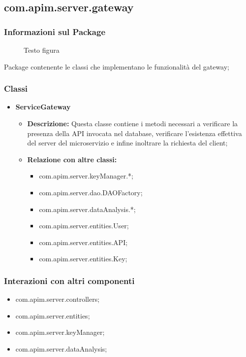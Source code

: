 {{  \subsection{com.apim.server.gateway}{
    \subsubsection{Informazioni sul Package}
      \begin{figure}[ht]
        \centering
        \caption{Testo figura}
        \label{Testo figura}
      \end{figure}
      Package  contenente le classi che implementano le funzionalità del gateway;
      \subsubsection{Classi}
      \begin{itemize} \itemsep1pt
      \item \textbf{ServiceGateway}
      \begin{itemize}
      \item \textbf{Descrizione:} Questa classe contiene i metodi necessari a verificare la presenza della API invocata nel database, verificare l'esistenza effettiva del server del microservizio e infine inoltrare la richiesta del client;
      \item \textbf{Relazione con altre classi:}
      \begin{itemize}
      \item com.apim.server.keyManager.*;
      \item com.apim.server.dao.DAOFactory;
      \item com.apim.server.dataAnalysis.*;
      \item com.apim.server.entities.User;
      \item com.apim.server.entities.API;
      \item com.apim.server.entities.Key;
      \end{itemize}
      \end{itemize}
      \end{itemize}
      \subsubsection{Interazioni con altri componenti}
      \begin{itemize}
      \item com.apim.server.controllers;
      \item com.apim.server.entities;
      \item com.apim.server.keyManager;
      \item com.apim.server.dataAnalysis;
      \end{itemize}
  }
}}

